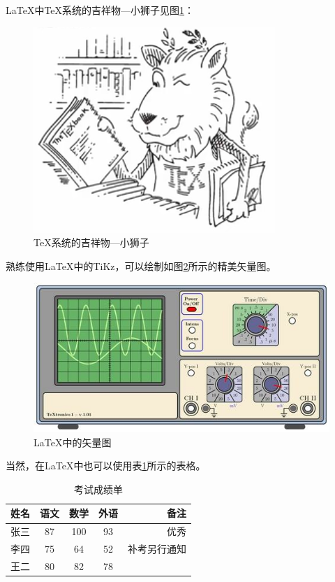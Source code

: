 \documentclass{ctexart}%
\begin{document}
	\LaTeX{}中\TeX 系统的吉祥物---小狮子见图\ref{fig-lion}：
	\begin{figure}[htbp]
		\centering
		\includegraphics[scale=0.3]{lion.png}
		\caption{\TeX 系统的吉祥物---小狮子}\label{fig-lion}
	\end{figure}
	

	熟练使用\LaTeX 中的TiKz，可以绘制如图\ref{fig-tikz}所示的精美矢量图。
	\begin{figure}[htbp]
		\centering
		\includegraphics[scale=0.3]{oscilloscope}
		\caption{\LaTeX 中的矢量图}\label{fig-tikz}
	\end{figure}
	
	当然，在\LaTeX{}中也可以使用表\ref{tab-score}所示的表格。
	\begin{table}[h]
		\centering
		\caption{考试成绩单}\label{tab-score}
		\begin{tabular}{l|c|c|c|r}
			\hline
			姓名 & 语文 & 数学 & 外语 & 备注 \\
			\hline \hline
			张三 & 87 & 100 & 93 & 优秀 \\
			\hline
			李四 & 75 & 64 & 52 & 补考另行通知 \\
			\hline
			王二 & 80 & 82 & 78 & \\
			\hline
		\end{tabular}
	\end{table}
	
\end{document}
